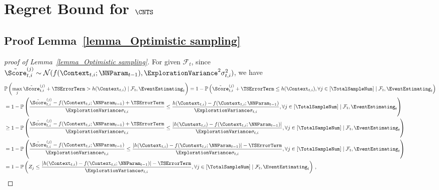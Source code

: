 \documentclass{article}
\theoremstyle{plain}
\begin{document}
\section{Regret Bound for $\CNTS$} \label{appx:sec_regret for CN-TS}

\subsection{Proof Lemma~\ref{lemma_Optimistic sampling}}
\begin{proof}[proof of Lemma~\ref{lemma_Optimistic sampling}]
For given $\mathcal{F}_t$, since $\tilde{\Score}_{t,i}^{(j)} \sim \mathcal{N}(f(\Context_{t,i};\NNParam_{t-1}), \ExplorationVariance^2 \sigma_{t,i}^2)$, we have
    \begin{align*}
        & \mathbb{P} \left( \max_j \tilde{\Score}_{t,i}^{(j)} + \TSErrorTerm > h(\Context_{t,i}) \mid
        \mathcal{F}_t, \EventEstimating_t \right)
        = 1 - \mathbb{P} \left( \tilde{\Score}_{t,i}^{(j)} + \TSErrorTerm \le h(\Context_{t,i}), \forall j \in [\TotalSampleNum] \mid \mathcal{F}_t, \EventEstimating_t \right)
        \\
        & = 1 - \mathbb{P} \left( \frac{\tilde{\Score}_{t,i}^{(j)} - f(\Context_{t,i};\NNParam_{t-1}) + \TSErrorTerm}{\ExplorationVariance \sigma_{t,i}} 
        \le \frac{h(\Context_{t,i}) - f(\Context_{t,i};\NNParam_{t-1})}{\ExplorationVariance \sigma_{t,i}}, \forall j \in [\TotalSampleNum] \mid \mathcal{F}_t, \EventEstimating_t \right)
        \\
        & \ge 1 - \mathbb{P} \left( \frac{\tilde{\Score}_{t,i}^{(j)} - f(\Context_{t,i};\NNParam_{t-1}) + \TSErrorTerm}{\ExplorationVariance \sigma_{t,i}} 
        \le \frac{ \left| h(\Context_{t,i}) - f(\Context_{t,i};\NNParam_{t-1}) \right| }{\ExplorationVariance \sigma_{t,i}}, \forall j \in [\TotalSampleNum] \mid \mathcal{F}_t, \EventEstimating_t \right)
        \\
        & = 1 - \mathbb{P} \left( \frac{\tilde{\Score}_{t,i}^{(j)} - f(\Context_{t,i};\NNParam_{t-1}) }{\ExplorationVariance \sigma_{t,i}} 
        \le \frac{ \left| h(\Context_{t,i}) - f(\Context_{t,i};\NNParam_{t-1}) \right| - \TSErrorTerm}{\ExplorationVariance \sigma_{t,i}}, \forall j \in [\TotalSampleNum] \mid \mathcal{F}_t, \EventEstimating_t \right)
        \\
        & = 1 - \mathbb{P} \left( Z_j \le \frac{ \left| h(\Context_{t,i}) - f(\Context_{t,i};\NNParam_{t-1}) \right| - \TSErrorTerm}{\ExplorationVariance \sigma_{t,i}}, \forall j \in [\TotalSampleNum] \mid \mathcal{F}_t, \EventEstimating_t \right) \, ,

\end{align*}
\end{proof}
\end{document}
